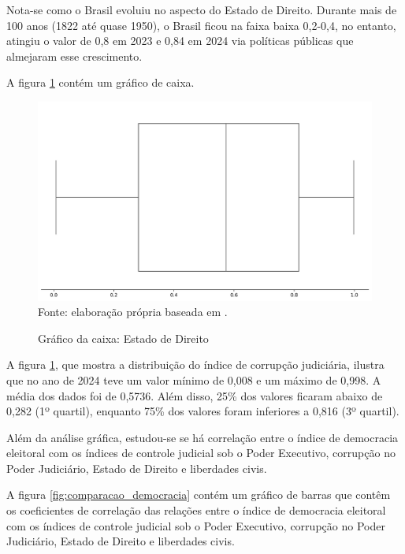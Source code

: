 Nota-se como o Brasil evoluiu no aspecto do Estado de Direito. Durante mais de 100 anos (1822 até quase 1950), o Brasil ficou na faixa baixa 0,2-0,4, no entanto, atingiu o valor de 0,8 em 2023 e 0,84 em 2024 via políticas públicas que almejaram esse crescimento.

A figura \ref{fig:quartis_estado_direito} contém um gráfico de caixa.

\begin{figure}[H]
	\centering
	\caption{Gráfico da caixa: Estado de Direito}
	\includegraphics[width=1\linewidth]{figuras/quartis_estado_direito.png}
	\label{fig:quartis_estado_direito}
	\footnotesize{Fonte: elaboração própria baseada em \cite{rule-of-law-index}.}
\end{figure}

A figura \ref{fig:quartis_estado_direito}, que mostra a distribuição do índice de corrupção judiciária, ilustra que no ano de 2024 teve um valor mínimo de 0,008 e um máximo de 0,998. A média dos dados foi de 0,5736. Além disso, 25\% dos valores ficaram abaixo de 0,282 (1º quartil), enquanto 75\% dos valores foram inferiores a 0,816 (3º quartil).

Além da análise gráfica, estudou-se se há correlação entre o índice de democracia eleitoral com os índices de controle judicial sob o Poder Executivo, corrupção no Poder Judiciário, Estado de Direito e liberdades civis.

A figura \ref{fig:comparacao_democracia} contém um gráfico de barras que contêm os coeficientes de correlação das relações entre o índice de democracia eleitoral com os índices de controle judicial sob o Poder Executivo, corrupção no Poder Judiciário, Estado de Direito e liberdades civis.


